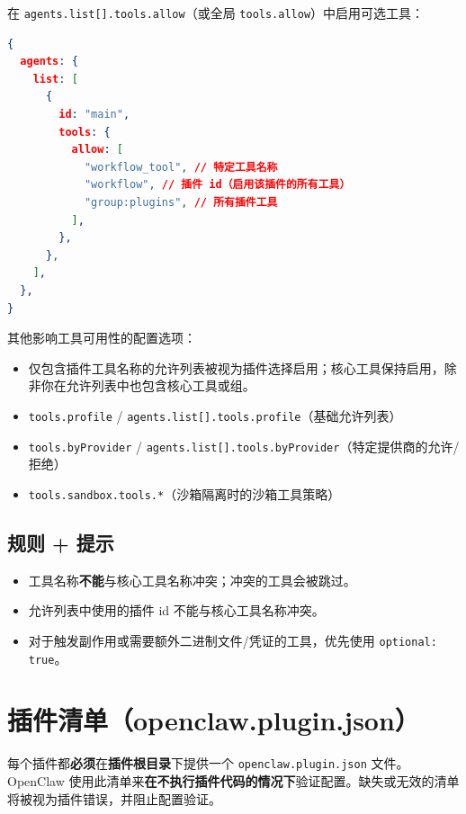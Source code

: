在 \texttt{agents.list[].tools.allow}（或全局 \texttt{tools.allow}）中启用可选工具：

\begin{lstlisting}[language=json]
{
  agents: {
    list: [
      {
        id: "main",
        tools: {
          allow: [
            "workflow_tool", // 特定工具名称
            "workflow", // 插件 id（启用该插件的所有工具）
            "group:plugins", // 所有插件工具
          ],
        },
      },
    ],
  },
}
\end{lstlisting}


其他影响工具可用性的配置选项：

\begin{itemize}
  \item 仅包含插件工具名称的允许列表被视为插件选择启用；核心工具保持启用，除非你在允许列表中也包含核心工具或组。
  \item \texttt{tools.profile} / \texttt{agents.list[].tools.profile}（基础允许列表）
  \item \texttt{tools.byProvider} / \texttt{agents.list[].tools.byProvider}（特定提供商的允许/拒绝）
  \item \texttt{tools.sandbox.tools.*}（沙箱隔离时的沙箱工具策略）
\end{itemize}


\subsection{规则 + 提示}


\begin{itemize}
  \item 工具名称\textbf{不能}与核心工具名称冲突；冲突的工具会被跳过。
  \item 允许列表中使用的插件 id 不能与核心工具名称冲突。
  \item 对于触发副作用或需要额外二进制文件/凭证的工具，优先使用 \texttt{optional: true}。
\end{itemize}



\clearpage

\section{插件清单（openclaw.plugin.json）}


每个插件都\textbf{必须}在\textbf{插件根目录}下提供一个 \texttt{openclaw.plugin.json} 文件。OpenClaw 使用此清单来\textbf{在不执行插件代码的情况下}验证配置。缺失或无效的清单将被视为插件错误，并阻止配置验证。

